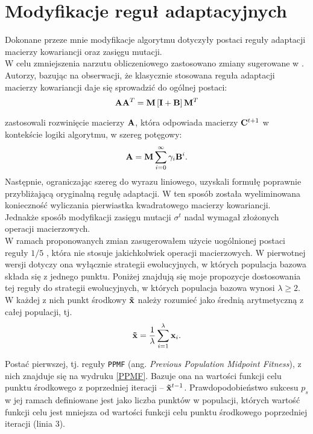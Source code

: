 \section{Modyfikacje reguł adaptacyjnych}
\label{section:modyfikacje}
  Dokonane przeze mnie modyfikacje algorytmu dotyczyły postaci 
  reguły adaptacji macierzy kowariancji oraz zasięgu mutacji. \\
  \indent W celu zmniejszenia narzutu obliczeniowego zastosowano zmiany sugerowane
  w \cite{SMAES}. Autorzy, bazując na obserwacji, że klasycznie stosowana reguła adaptacji macierzy kowariancji daje się sprowadzić do ogólnej postaci:
    \begin{equation}
      {\bf A}{\bf A}^{T} = {\bf M}\left[{\bf I} + {\bf B}\right]{\bf M}^{T}
    \end{equation}

\noindent zastosowali rozwinięcie macierzy ${\bf A}$, która odpowiada macierzy ${\bf C}^{t+1}$ w kontekście logiki algorytmu, w szereg potęgowy:
    \begin{equation}
      {\bf A} = {\bf M}\sum^{\infty}_{i = 0}\gamma_{i}{\bf B}^{i}. 
    \end{equation}
   \indent Następnie, ograniczając szereg do wyrazu liniowego, uzyskali formułę poprawnie
    przybliżającą oryginalną regułę adaptacji.
    W ten sposób została wyeliminowana konieczność wyliczania pierwiastka kwadratowego macierzy kowariancji.\\
    Jednakże sposób modyfikacji zasięgu mutacji $\sigma^{t}$ nadal wymagał złożonych operacji macierzowych.\\
   \indent W ramach proponowanych zmian zasugerowałem użycie uogólnionej postaci reguły $1/5$ \cite{Schwefel95}, która nie stosuje jakichkolwiek operacji macierzowych. W pierwotnej wersji dotyczy ona wyłącznie strategii ewolucyjnych, w których populacja bazowa składa się z jednego punktu.
    Poniżej znajdują się moje propozycje dostosowania tej reguły do strategii ewolucyjnych, w których populacja bazowa wynosi $\lambda \geq 2$. W każdej z nich punkt środkowy ${\bf \tilde x}$ należy rozumieć jako średnią arytmetyczną z całej populacji, tj.
    \begin{equation}
      {\bf \tilde x} = \frac{1}{\lambda}\sum^{\lambda}_{i = 1} {\bf x}_{i}.
    \end{equation}

    Postać pierwszej, tj. reguły \texttt{PPMF} (ang. \textit{Previous Population Midpoint Fitness}), z nich znajduje się na wydruku \ref{PPMF}. Bazuje ona na wartości funkcji celu punktu środkowego z poprzedniej iteracji -- ${\bf \tilde x}^{t-1}$. Prawdopodobieństwo sukcesu $p_s$ w jej ramach definiowane jest jako liczba punktów w populacji, których wartość funkcji celu jest mniejsza od wartości funkcji celu punktu środkowego poprzedniej iteracji (linia 3).

